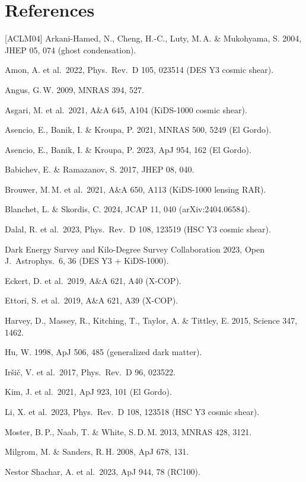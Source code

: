 \documentclass[10pt]{article}
\begin{document}
\section*{References}
{\small
[ACLM04] Arkani-Hamed, N., Cheng, H.-C., Luty, M.\,A. \& Mukohyama, S. 2004, JHEP 05, 074 (ghost condensation).\par
[Amo22] Amon, A. et al.\ 2022, Phys.\ Rev.\ D 105, 023514 (DES Y3 cosmic shear).\par
[Ang09] Angus, G.\,W. 2009, MNRAS 394, 527.\par
[Asg21] Asgari, M. et al.\ 2021, A\&A 645, A104 (KiDS-1000 cosmic shear).\par
[AsBK21] Asencio, E., Banik, I. \& Kroupa, P. 2021, MNRAS 500, 5249 (El Gordo).\par
[AsBK23] Asencio, E., Banik, I. \& Kroupa, P. 2023, ApJ 954, 162 (El Gordo).\par
[BR17] Babichev, E. \& Ramazanov, S. 2017, JHEP 08, 040.\par
[Bro21] Brouwer, M.\,M. et al.\ 2021, A\&A 650, A113 (KiDS-1000 lensing RAR).\par
[BS24] Blanchet, L. \& Skordis, C. 2024, JCAP 11, 040 (arXiv:2404.06584).\par
[Dal23] Dalal, R. et al.\ 2023, Phys.\ Rev.\ D 108, 123519 (HSC Y3 cosmic shear).\par
[DK23] Dark Energy Survey and Kilo-Degree Survey Collaboration 2023, Open J.\ Astrophys.\ 6, 36 (DES Y3 + KiDS-1000).\par
[Eck19] Eckert, D. et al.\ 2019, A\&A 621, A40 (X-COP).\par
[Ett19] Ettori, S. et al.\ 2019, A\&A 621, A39 (X-COP).\par
[Har15] Harvey, D., Massey, R., Kitching, T., Taylor, A. \& Tittley, E. 2015, Science 347, 1462.\par
[Hu98] Hu, W. 1998, ApJ 506, 485 (generalized dark matter).\par
[Irs17] Ir\v{s}i\v{c}, V. et al.\ 2017, Phys.\ Rev.\ D 96, 023522.\par
[Kim21] Kim, J. et al.\ 2021, ApJ 923, 101 (El Gordo).\par
[Li23] Li, X. et al.\ 2023, Phys.\ Rev.\ D 108, 123518 (HSC Y3 cosmic shear).\par
[MNW13] Moster, B.\,P., Naab, T. \& White, S.\,D.\,M. 2013, MNRAS 428, 3121.\par
[MS08] Milgrom, M. \& Sanders, R.\,H. 2008, ApJ 678, 131.\par
[NS23] Nestor Shachar, A. et al.\ 2023, ApJ 944, 78 (RC100).\par
}
\end{document}
